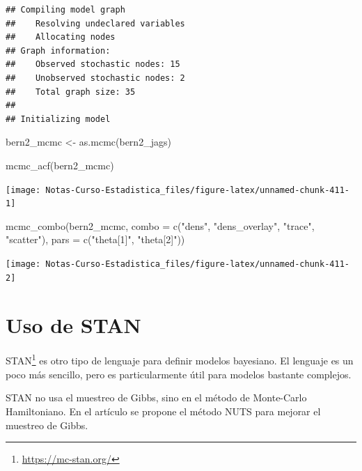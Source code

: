 \documentclass[
  12pt,
]{book}
\newenvironment{Shaded}{\begin{snugshade}}{\end{snugshade}}
\newcommand{\AttributeTok}[1]{\textcolor[rgb]{0.77,0.63,0.00}{#1}}
\newcommand{\FunctionTok}[1]{\textcolor[rgb]{0.00,0.00,0.00}{#1}}
\newcommand{\NormalTok}[1]{#1}
\newcommand{\OtherTok}[1]{\textcolor[rgb]{0.56,0.35,0.01}{#1}}
\newcommand{\StringTok}[1]{\textcolor[rgb]{0.31,0.60,0.02}{#1}}
\theoremstyle{definition}
\theoremstyle{definition}
\theoremstyle{definition}
\theoremstyle{definition}
\theoremstyle{remark}
\begin{document}
\begin{verbatim}
## Compiling model graph
##    Resolving undeclared variables
##    Allocating nodes
## Graph information:
##    Observed stochastic nodes: 15
##    Unobserved stochastic nodes: 2
##    Total graph size: 35
## 
## Initializing model
\end{verbatim}

\begin{Shaded}
\begin{Highlighting}[]
\NormalTok{bern2\_mcmc }\OtherTok{\textless{}{-}} \FunctionTok{as.mcmc}\NormalTok{(bern2\_jags)}

\FunctionTok{mcmc\_acf}\NormalTok{(bern2\_mcmc)}
\end{Highlighting}
\end{Shaded}

\begin{center}\texttt{[image: Notas-Curso-Estadistica\_files/figure-latex/unnamed-chunk-411-1]} \end{center}

\begin{Shaded}
\begin{Highlighting}[]
\FunctionTok{mcmc\_combo}\NormalTok{(bern2\_mcmc, }\AttributeTok{combo =} \FunctionTok{c}\NormalTok{(}\StringTok{"dens"}\NormalTok{, }\StringTok{"dens\_overlay"}\NormalTok{,}
    \StringTok{"trace"}\NormalTok{, }\StringTok{"scatter"}\NormalTok{), }\AttributeTok{pars =} \FunctionTok{c}\NormalTok{(}\StringTok{"theta[1]"}\NormalTok{, }\StringTok{"theta[2]"}\NormalTok{))}
\end{Highlighting}
\end{Shaded}

\begin{center}\texttt{[image: Notas-Curso-Estadistica\_files/figure-latex/unnamed-chunk-411-2]} \end{center}

\hypertarget{uso-de-stan}{%
\section{Uso de STAN}\label{uso-de-stan}}

STAN\footnote{\url{https://mc-stan.org/}} es otro tipo de lenguaje para definir modelos bayesiano. El lenguaje es un poco más sencillo, pero es particularmente útil para modelos bastante complejos.

STAN no usa el muestreo de Gibbs, sino en el método de Monte-Carlo Hamiltoniano. En el artículo \autocite{Hoffman2014} se propone el método NUTS para mejorar el muestreo de Gibbs.
\end{document}
